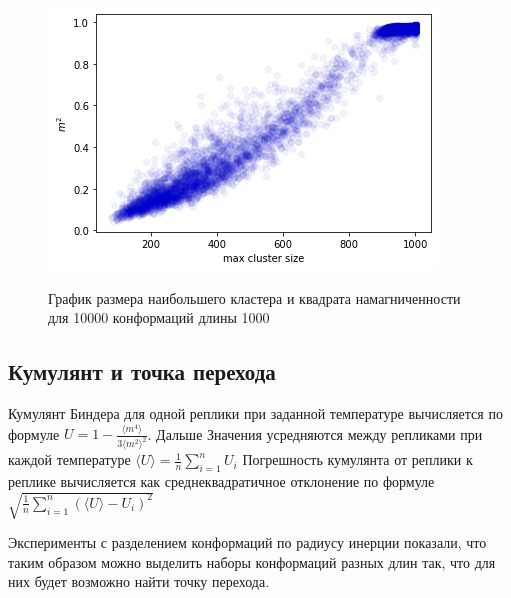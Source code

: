 \begin{figure}[h]
	\centering
	\caption{График размера наибольшего кластера и квадрата намагниченности для 10000 конформаций длины 1000}
	\includegraphics[scale=1]{../images/mag_from_cluster_size.png} 
	\label{fig:mag_from_max_cluster}
\end{figure}




\subsection{Кумулянт и точка перехода}

Кумулянт Биндера для одной реплики при заданной температуре вычисляется по формуле $U = 1 - \frac{\langle m^4\rangle}{3\langle m^2\rangle ^2}$. Дальше Значения усредняются между репликами при каждой температуре $\langle U\rangle = \frac{1}{n}\sum_{i=1}^{n}U_i$ 
Погрешность кумулянта от реплики к реплике вычисляется как среднеквадратичное отклонение по формуле $\sqrt{\frac{1}{n}\sum_{i=1}^{n}(\langle U\rangle - U_i)^2}$


Эксперименты с разделением конформаций по радиусу инерции показали, что таким образом можно выделить наборы конформаций разных длин так, что для них будет возможно найти точку перехода.

